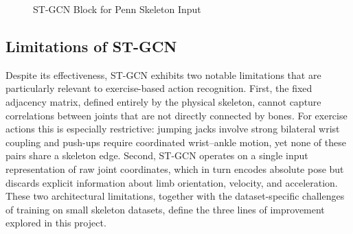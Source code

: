 \begin{figure}[ht]
\caption{ST-GCN Block for Penn Skeleton Input}
\label{fig:stgcn-block}
\end{figure}

\subsection{Limitations of ST-GCN}
Despite its effectiveness, ST-GCN exhibits two notable limitations that are particularly relevant to exercise-based action recognition. First, the fixed adjacency matrix, defined entirely by the physical skeleton, cannot capture correlations between joints that are not directly connected by bones. For exercise actions this is especially restrictive: jumping jacks involve strong bilateral wrist coupling and push-ups require coordinated wrist–ankle motion, yet none of these pairs share a skeleton edge. Second, ST-GCN operates on a single input representation of raw joint coordinates,  which in turn encodes absolute pose but discards explicit information about limb orientation, velocity, and acceleration. These two architectural limitations, together with the dataset-specific challenges of training on small skeleton datasets, define the three lines of improvement explored in this project.

